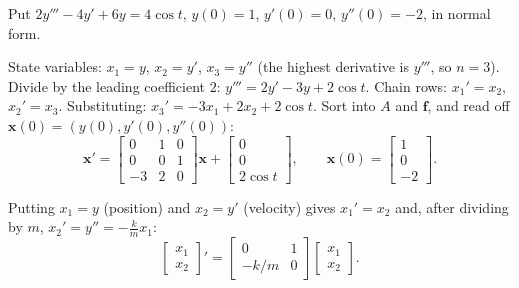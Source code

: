 \documentclass[10pt]{scrartcl}
\newcommand{\vv}[1]{\mathbf{#1}}
\begin{document}
\begin{example*}
  Put $2y'''-4y'+6y=4\cos t$, $y(0)=1$, $y'(0)=0$, $y''(0)=-2$, in normal form.
  \begin{steps}
    \ii State variables: $x_1=y$, $x_2=y'$, $x_3=y''$ (the highest derivative is $y'''$, so $n=3$).
    \ii Divide by the leading coefficient $2$: $y'''=2y'-3y+2\cos t$.
    \ii Chain rows: $x_1'=x_2$, $x_2'=x_3$. Substituting: $x_3'=-3x_1+2x_2+2\cos t$.
    \ii Sort into $A$ and $\vv f$, and read off $\vv x(0)=(y(0),y'(0),y''(0))$:
    \[
      \vv x'=\begin{bmatrix}0&1&0\\0&0&1\\-3&2&0\end{bmatrix}\vv x+\begin{bmatrix}0\\0\\2\cos t\end{bmatrix},\qquad \vv x(0)=\begin{bmatrix}1\\0\\-2\end{bmatrix}.
    \]
  \end{steps}
\end{example*}

\begin{example*}[The spring $my''+ky=0$ as a first-order system (Nagle 9.1)]
  Putting $x_1=y$ (position) and $x_2=y'$ (velocity) gives $x_1'=x_2$ and, after dividing by $m$, $x_2'=y''=-\frac{k}{m}x_1$:
  \[
    \begin{bmatrix}x_1\\x_2\end{bmatrix}' = \begin{bmatrix}0&1\\-k/m&0\end{bmatrix}\begin{bmatrix}x_1\\x_2\end{bmatrix}.
  \]
\end{example*}
\end{document}
